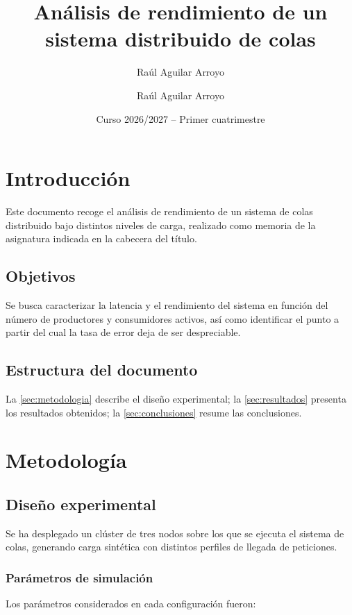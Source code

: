 \documentclass[11pt,twoside]{article}
\title{Análisis de rendimiento de un sistema distribuido de colas}
\author{Raúl Aguilar Arroyo \and Raúl Aguilar Arroyo}
\date{Curso 2026/2027 -- Primer cuatrimestre}
\begin{document}
\maketitle

\section{Introducción}

Este documento recoge el análisis de rendimiento de un sistema de colas
distribuido bajo distintos niveles de carga, realizado como memoria de la
asignatura indicada en la cabecera del título.

\subsection{Objetivos}

Se busca caracterizar la latencia y el rendimiento del sistema en función
del número de productores y consumidores activos, así como identificar el
punto a partir del cual la tasa de error deja de ser despreciable.

\subsection{Estructura del documento}

La \autoref{sec:metodologia} describe el diseño experimental; la
\autoref{sec:resultados} presenta los resultados obtenidos; la
\autoref{sec:conclusiones} resume las conclusiones.

\section{Metodología}
\label{sec:metodologia}

\subsection{Diseño experimental}

Se ha desplegado un clúster de tres nodos sobre los que se ejecuta el
sistema de colas, generando carga sintética con distintos perfiles de
llegada de peticiones.

\subsubsection{Parámetros de simulación}

Los parámetros considerados en cada configuración fueron:
\end{document}
